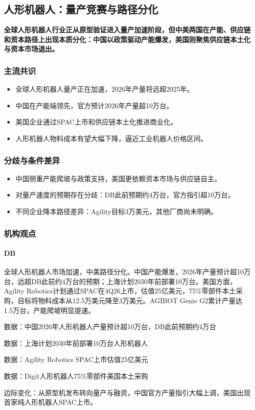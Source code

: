 \documentclass[11pt]{ctexart}
\begin{document}
\subsection{人形机器人：量产竞赛与路径分化}
\textbf{全球人形机器人行业正从原型验证进入量产加速阶段，但中美两国在产能、供应链和资本路径上出现本质分化：中国以政策驱动产能爆发，美国则聚焦供应链本土化与资本市场退出。}
\subsubsection*{主流共识}
\begin{itemize}
  \item 全球人形机器人量产正在加速，2026年产量将远超2025年。
  \item 中国在产能端领先，官方预计2026年产量超10万台。
  \item 美国企业通过SPAC上市和供应链本土化推进商业化。
  \item 人形机器人物料成本有望大幅下降，逼近工业机器人价格区间。
\end{itemize}
\subsubsection*{分歧与条件差异}
\begin{itemize}
  \item 中国侧重产能爬坡与政策支持，美国更依赖资本市场与供应链自主。
  \item 对量产速度的预期存在分歧：DB此前预期约4万台，官方指引超10万台。
  \item 不同企业降本路径差异：Agility目标3万美元，其他厂商尚未明确。
\end{itemize}
\subsubsection*{机构观点}
\paragraph{DB} 全球人形机器人市场加速，中美路径分化。中国产能爆发，2026年产量预计超10万台，远超DB此前约4万台的预期；上海计划2030年前部署10万台。美国方面，Agility Robotics计划通过SPAC在4Q26上市，估值25亿美元，75\%零部件本土采购，目标将物料成本从12.5万美元降至3万美元。AGIBOT Genie G2累计产量达1.5万台，产能爬坡明显提速。
{\small\color{refgray}数据：中国2026年人形机器人产量预计超10万台，DB此前预期约4万台\par}
{\small\color{refgray}数据：上海计划2030年前部署10万台人形机器人\par}
{\small\color{refgray}数据：Agility Robotics SPAC上市估值25亿美元\par}
{\small\color{refgray}数据：Digit人形机器人75\%零部件美国本土采购\par}
{\small\color{refgray}边际变化：从原型机发布转向量产与融资，中国官方产量指引大幅上调，美国出现首家纯人形机器人SPAC上市。\par}
\end{document}
